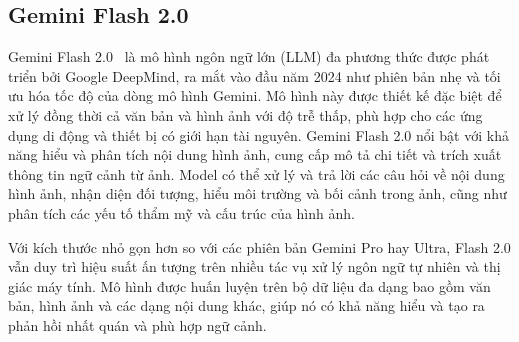 \subsection{Gemini Flash 2.0}
Gemini Flash 2.0~\cite{gemini} là mô hình ngôn ngữ lớn (LLM) đa phương thức được phát triển bởi Google DeepMind, ra mắt vào đầu năm 2024 như phiên bản nhẹ và tối ưu hóa tốc độ của dòng mô hình Gemini. Mô hình này được thiết kế đặc biệt để xử lý đồng thời cả văn bản và hình ảnh với độ trễ thấp, phù hợp cho các ứng dụng di động và thiết bị có giới hạn tài nguyên. Gemini Flash 2.0 nổi bật với khả năng hiểu và phân tích nội dung hình ảnh, cung cấp mô tả chi tiết và trích xuất thông tin ngữ cảnh từ ảnh. Model có thể xử lý và trả lời các câu hỏi về nội dung hình ảnh, nhận diện đối tượng, hiểu môi trường và bối cảnh trong ảnh, cũng như phân tích các yếu tố thẩm mỹ và cấu trúc của hình ảnh.

Với kích thước nhỏ gọn hơn so với các phiên bản Gemini Pro hay Ultra, Flash 2.0 vẫn duy trì hiệu suất ấn tượng trên nhiều tác vụ xử lý ngôn ngữ tự nhiên và thị giác máy tính. Mô hình được huấn luyện trên bộ dữ liệu đa dạng bao gồm văn bản, hình ảnh và các dạng nội dung khác, giúp nó có khả năng hiểu và tạo ra phản hồi nhất quán và phù hợp ngữ cảnh. 
